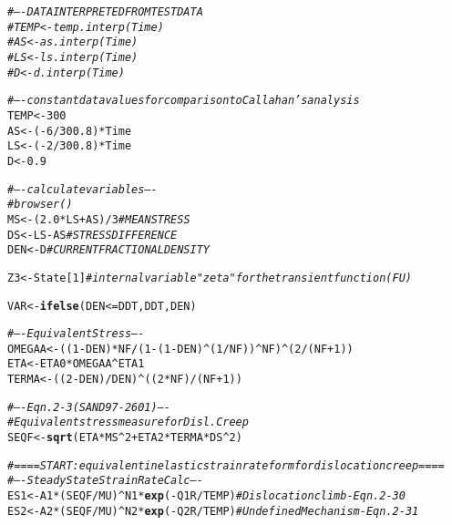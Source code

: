 \documentclass{article}\usepackage[]{graphicx}\usepackage[]{color}
\makeatletter
\newcommand{\hlnum}[1]{\textcolor[rgb]{0.686,0.059,0.569}{#1}}%
\newcommand{\hlcom}[1]{\textcolor[rgb]{0.678,0.584,0.686}{\textit{#1}}}%
\newcommand{\hlopt}[1]{\textcolor[rgb]{0,0,0}{#1}}%
\newcommand{\hlstd}[1]{\textcolor[rgb]{0.345,0.345,0.345}{#1}}%
\newcommand{\hlkwb}[1]{\textcolor[rgb]{0.69,0.353,0.396}{#1}}%
\newcommand{\hlkwd}[1]{\textcolor[rgb]{0.737,0.353,0.396}{\textbf{#1}}}%
\newenvironment{kframe}{%
 \def\at@end@of@kframe{}%
 \ifinner\ifhmode%
  \def\at@end@of@kframe{\end{minipage}}%
  \begin{minipage}{\columnwidth}%
 \fi\fi%
 \def\FrameCommand##1{\hskip\@totalleftmargin \hskip-\fboxsep
 \colorbox{shadecolor}{##1}\hskip-\fboxsep
     \hskip-\linewidth \hskip-\@totalleftmargin \hskip\columnwidth}%
 \MakeFramed {\advance\hsize-\width
   \@totalleftmargin\z@ \linewidth\hsize
   \@setminipage}}%
 {\par\unskip\endMakeFramed%
 \at@end@of@kframe}
\newenvironment{knitrout}{}{} %
\makeatother
\begin{document}
\begin{knitrout}
\begin{kframe}
\begin{alltt}
  \hlcom{#---- DATA INTERPRETED FROM TEST DATA}
\hlcom{#   TEMP <- temp.interp(Time)}
\hlcom{#   AS   <- as.interp(Time)}
\hlcom{#   LS   <- ls.interp(Time)}
\hlcom{#   D    <- d.interp(Time)}

  \hlcom{#---- constant data values for comparison to Callahan's analysis}
  \hlstd{TEMP} \hlkwb{<-} \hlnum{300}
  \hlstd{AS}   \hlkwb{<-} \hlstd{(}\hlopt{-}\hlnum{6}\hlopt{/}\hlnum{300.8}\hlstd{)}\hlopt{*}\hlstd{Time}
  \hlstd{LS}   \hlkwb{<-} \hlstd{(}\hlopt{-}\hlnum{2}\hlopt{/}\hlnum{300.8}\hlstd{)}\hlopt{*}\hlstd{Time}
  \hlstd{D}    \hlkwb{<-} \hlnum{0.9}

  \hlcom{# ---- calculate variables ----}
\hlcom{# browser()}
  \hlstd{MS}  \hlkwb{<-} \hlstd{(}\hlnum{2.0} \hlopt{*} \hlstd{LS} \hlopt{+} \hlstd{AS)} \hlopt{/} \hlnum{3}   \hlcom{# MEAN STRESS}
  \hlstd{DS}    \hlkwb{<-} \hlstd{LS} \hlopt{-} \hlstd{AS}                                     \hlcom{# STRESS DIFFERENCE}
  \hlstd{DEN} \hlkwb{<-} \hlstd{D}                     \hlcom{# CURRENT FRACTIONAL DENSITY}

  \hlstd{Z3}  \hlkwb{<-} \hlstd{State[}\hlnum{1}\hlstd{]} \hlcom{# internal variable "zeta" for the transient function (FU)}

  \hlstd{VAR} \hlkwb{<-} \hlkwd{ifelse}\hlstd{(DEN} \hlopt{<=} \hlstd{DDT, DDT, DEN)}

  \hlcom{# ---- Equivalent Stress ----}
  \hlstd{OMEGAA}   \hlkwb{<-} \hlstd{((}\hlnum{1} \hlopt{-} \hlstd{DEN)} \hlopt{*} \hlstd{NF} \hlopt{/} \hlstd{(}\hlnum{1} \hlopt{-} \hlstd{(}\hlnum{1} \hlopt{-} \hlstd{DEN)}\hlopt{^}\hlstd{(}\hlnum{1}\hlopt{/}\hlstd{NF))}\hlopt{^}\hlstd{NF)}\hlopt{^}\hlstd{(}\hlnum{2}\hlopt{/}\hlstd{(NF} \hlopt{+} \hlnum{1}\hlstd{))}
  \hlstd{ETA}              \hlkwb{<-} \hlstd{ETA0} \hlopt{*} \hlstd{OMEGAA}\hlopt{^}\hlstd{ETA1}
  \hlstd{TERMA}    \hlkwb{<-} \hlstd{((}\hlnum{2} \hlopt{-} \hlstd{DEN)}\hlopt{/}\hlstd{DEN)}\hlopt{^}\hlstd{((}\hlnum{2} \hlopt{*} \hlstd{NF)}\hlopt{/}\hlstd{(NF} \hlopt{+} \hlnum{1}\hlstd{))}

  \hlcom{# ---- Eqn. 2-3 (SAND97-2601) ----}
  \hlcom{# Equivalent stress measure for Disl. Creep}
  \hlstd{SEQF}  \hlkwb{<-} \hlkwd{sqrt}\hlstd{(ETA} \hlopt{*} \hlstd{MS}\hlopt{^}\hlnum{2} \hlopt{+} \hlstd{ETA2} \hlopt{*} \hlstd{TERMA} \hlopt{*} \hlstd{DS}\hlopt{^}\hlnum{2}\hlstd{)}

  \hlcom{# ==== START: equivalent inelastic strain rate form for dislocation creep ====}
  \hlcom{# ---- Steady State Strain Rate Calc ----}
  \hlstd{ES1} \hlkwb{<-} \hlstd{A1} \hlopt{*} \hlstd{(SEQF} \hlopt{/} \hlstd{MU)}\hlopt{^}\hlstd{N1} \hlopt{*} \hlkwd{exp}\hlstd{(}\hlopt{-}\hlstd{Q1R}\hlopt{/}\hlstd{TEMP)}   \hlcom{# Dislocation climb - Eqn. 2-30}
  \hlstd{ES2} \hlkwb{<-} \hlstd{A2} \hlopt{*} \hlstd{(SEQF} \hlopt{/} \hlstd{MU)}\hlopt{^}\hlstd{N2} \hlopt{*} \hlkwd{exp}\hlstd{(}\hlopt{-}\hlstd{Q2R}\hlopt{/}\hlstd{TEMP)}   \hlcom{# Undefined Mechanism - Eqn. 2-31}


\end{alltt}
\end{kframe}
\end{knitrout}
\end{document}
